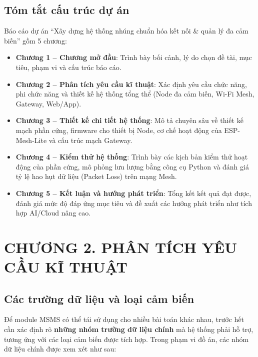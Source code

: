 \documentclass{article} %
\begin{document}
\subsection{Tóm tắt cấu trúc dự án}
Báo cáo dự án ``Xây dựng hệ thống nhúng chuẩn hóa kết nối \& quản lý đa cảm biến'' gồm 5 chương:
\begin{itemize}
    \item \textbf{Chương 1 – Chương mở đầu}: Trình bày bối cảnh, lý do chọn đề tài, mục tiêu, phạm vi và cấu trúc báo cáo.
    \item \textbf{Chương 2 – Phân tích yêu cầu kĩ thuật}: Xác định yêu cầu chức năng, phi chức năng và thiết kế hệ thống tổng thể (Node đa cảm biến, Wi-Fi Mesh, Gateway, Web/App).
    \item \textbf{Chương 3 – Thiết kế chi tiết hệ thống}: Mô tả chuyên sâu về thiết kế mạch phần cứng, firmware cho thiết bị Node, cơ chế hoạt động của ESP-Mesh-Lite và cấu trúc mạch Gateway.
    \item \textbf{Chương 4 – Kiểm thử hệ thống}: Trình bày các kịch bản kiểm thử hoạt động của phần cứng, mô phỏng lưu lượng bằng công cụ Python và đánh giá tỷ lệ hao hụt dữ liệu (Packet Loss) trên mạng Mesh.
    \item \textbf{Chương 5 – Kết luận và hướng phát triển}: Tổng kết kết quả đạt được, đánh giá mức độ đáp ứng mục tiêu và đề xuất các hướng phát triển như tích hợp AI/Cloud nâng cao.
\end{itemize}

\newpage

\section*{CHƯƠNG 2. PHÂN TÍCH YÊU CẦU KĨ THUẬT}
\label{chuong2}
\setcounter{section}{2}
\setcounter{subsection}{0} %
\setcounter{figure}{0}
\setcounter{table}{0}

\subsection{Các trường dữ liệu và loại cảm biến}
\label{canguavan}
Để module MSMS có thể tái sử dụng cho nhiều bài toán khác nhau, trước hết cần xác định rõ \textbf{những nhóm trường dữ liệu chính} mà hệ thống phải hỗ trợ, tương ứng với các loại cảm biến được tích hợp. Trong phạm vi đồ án, các nhóm dữ liệu chính được xem xét như sau:
\end{document}
